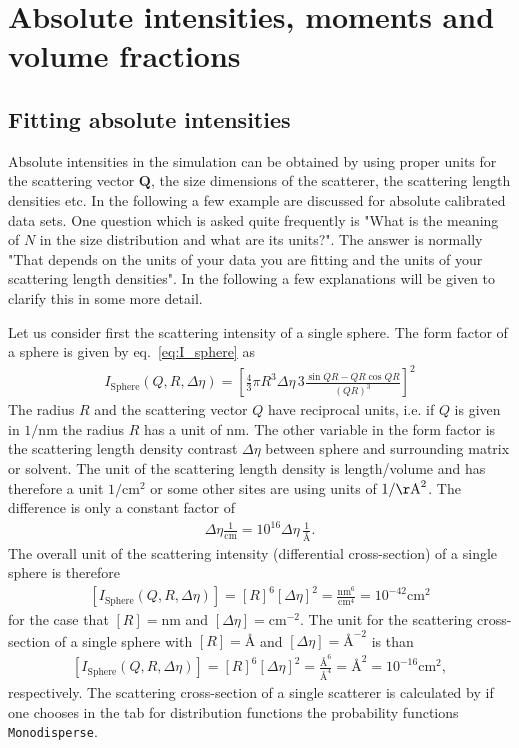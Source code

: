 \chapter{Absolute intensities, moments and volume fractions}
\label{ch:absint}

\section{Fitting absolute intensities}

Absolute intensities in the simulation can be obtained by using
proper units for the scattering vector $\mathbf{Q}$, the size
dimensions of the scatterer, the scattering length densities etc. In
the following a few example are discussed for absolute calibrated
data sets. One question which is asked quite frequently is "What is
the meaning of $N$ in the size distribution and what are its units?".
The answer is normally "That depends on the units of your data you
are fitting and the units of your scattering length densities". In
the following a few explanations will be given to clarify this in
some more detail.

Let us consider first the scattering intensity of a single sphere.
The form factor of a sphere is given by eq.\ \ref{eq:I_sphere} as
\begin{align}
I_\text{Sphere}(Q,R,\Delta\eta) =  \left[\frac{4}{3}\pi R^3 \Delta\eta \, 3
\frac{\sin QR - QR \cos QR}{(QR)^3} \right]^2
\end{align}
The radius $R$ and the scattering vector $Q$ have reciprocal units,
i.e. if $Q$ is given in $1/\mathrm{nm}$ the radius $R$ has a unit of
nm. The other variable in the form factor is the scattering length
density contrast $\Delta\eta$ between sphere and surrounding matrix
or solvent. The unit of the scattering length density is
length/volume and has therefore a unit $1/\mathrm{cm}^2$ or some
other sites are using units of $1/\mathrm{{\AA}}^2$. The difference is only a
constant factor of
\begin{align}
\Delta\eta \frac{1}{\textrm{cm}}=
10^{16} \Delta\eta\, \frac{1}{\textrm{\AA}}.
\end{align}
The overall unit of the scattering intensity (differential cross-section)
of a single sphere is therefore
\begin{align}
\left[ I_\text{Sphere}(Q,R,\Delta\eta) \right] =
\left[R\right]^6 \left[\Delta\eta\right]^2 =
\frac{\textrm{nm}^6}{\textrm{cm}^4} =
10^{-42} \textrm{cm}^2
\end{align}
for the case that $[R]=\textrm{nm}$ and
$[\Delta\eta]=\textrm{cm}^{-2}$. The unit for the scattering
cross-section of a single sphere with $[R]=\textrm{\AA}$ and
$[\Delta\eta]=\textrm{\AA}^{-2}$ is than
\begin{align}
\left[ I_\text{Sphere}(Q,R,\Delta\eta) \right] =
\left[R\right]^6 \left[\Delta\eta\right]^2 =
\frac{\textrm{\AA}^6}{\textrm{\AA}^4} = \textrm{\AA}^2 =
10^{-16} \textrm{cm}^2,
\end{align}
respectively. The scattering cross-section of a single scatterer is calculated by
\SASfit if one chooses in the tab for distribution functions the probability
functions \texttt{Monodisperse}.

